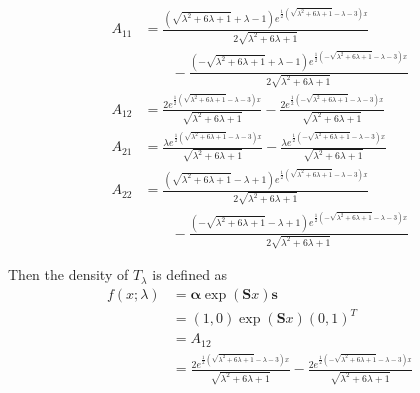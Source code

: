\documentclass{article}
\theoremstyle{plain}
\theoremstyle{definition}
\theoremstyle{remark}
\numberwithin{equation}{section}
\begin{document}
\begin{align*}
A_{11} &= \frac{\left(\sqrt{\lambda ^2+6 \lambda +1}+\lambda -1\right) e^{\frac{1}{2}
   \left(\sqrt{\lambda ^2+6 \lambda +1}-\lambda -3\right) x}}{2 \sqrt{\lambda ^2+6
   \lambda +1}}\\
   &\quad\quad- \frac{\left(-\sqrt{\lambda ^2+6 \lambda +1}+\lambda -1\right)
   e^{\frac{1}{2} \left(-\sqrt{\lambda ^2+6 \lambda +1}-\lambda -3\right) x}}{2
   \sqrt{\lambda ^2+6 \lambda +1}}\\
   A_{12} &= \frac{2 e^{\frac{1}{2} \left(\sqrt{\lambda ^2+6
   \lambda +1}-\lambda -3\right) x}}{\sqrt{\lambda ^2+6 \lambda +1}}-\frac{2
   e^{\frac{1}{2} \left(-\sqrt{\lambda ^2+6 \lambda +1}-\lambda -3\right)
   x}}{\sqrt{\lambda ^2+6 \lambda +1}}\\
   A_{21} &= \frac{\lambda  e^{\frac{1}{2} \left(\sqrt{\lambda ^2+6 \lambda +1}-\lambda -3\right)
   x}}{\sqrt{\lambda ^2+6 \lambda +1}}-\frac{\lambda  e^{\frac{1}{2}
   \left(-\sqrt{\lambda ^2+6 \lambda +1}-\lambda -3\right) x}}{\sqrt{\lambda ^2+6
   \lambda +1}}\\
   A_{22} &= \frac{\left(\sqrt{\lambda ^2+6 \lambda +1}-\lambda +1\right)
   e^{\frac{1}{2} \left(\sqrt{\lambda ^2+6 \lambda +1}-\lambda -3\right) x}}{2
   \sqrt{\lambda ^2+6 \lambda +1}}\\
   &\quad\quad-\frac{\left(-\sqrt{\lambda ^2+6 \lambda
   +1}-\lambda +1\right) e^{\frac{1}{2} \left(-\sqrt{\lambda ^2+6 \lambda +1}-\lambda
   -3\right) x}}{2 \sqrt{\lambda ^2+6 \lambda +1}}
\end{align*}

Then the density of $T_\lambda$ is defined as
\begin{align}
f(x; \lambda) &= \boldsymbol{\alpha} \exp(\mathbf{S} x) \mathbf{s} \nonumber\\
&= (1, 0) \exp(\mathbf{S} x) (0,1)^T \nonumber\\
&= A_{12} \nonumber\\
&= \frac{2 e^{\frac{1}{2} \left(\sqrt{\lambda ^2+6
   \lambda +1}-\lambda -3\right) x}}{\sqrt{\lambda ^2+6 \lambda +1}}-\frac{2
   e^{\frac{1}{2} \left(-\sqrt{\lambda ^2+6 \lambda +1}-\lambda -3\right)
   x}}{\sqrt{\lambda ^2+6 \lambda +1}} \label{eq:t_density}
\end{align}
\end{document}
